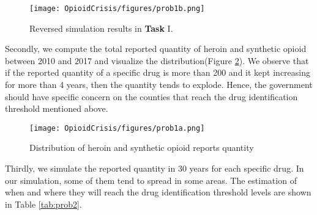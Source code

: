 \documentclass[a4paper]{article}
\begin{document}
\begin{figure}[h]
	\centering  
	\texttt{[image: OpioidCrisis/figures/prob1b.png]} 
	\caption{Reversed simulation results in \textbf{Task} I.} 
	\label{fig:prob1b}  
\end{figure}

Secondly, we compute the total reported quantity of heroin and synthetic opioid between 2010 and 2017 and visualize the distribution(Figure \ref{fig:prob1a}). We observe that if the reported quantity of a specific drug is more than 200 and it kept increasing for more than 4 years, then the quantity tends to explode. Hence, the government should have specific concern on the counties that reach the drug identification threshold mentioned above.\\

\begin{figure}[h]
	\centering  
	\texttt{[image: OpioidCrisis/figures/prob1a.png]} 
	\caption{Distribution of heroin and synthetic opioid reports quantity} 
	\label{fig:prob1a}  
\end{figure}

Thirdly, we simulate the reported quantity in 30 years for each specific drug. In our simulation, some of them tend to spread in some areas. The estimation of when and where they will reach the drug identification threshold levels are shown in Table \ref{tab:prob2}.
\end{document}
